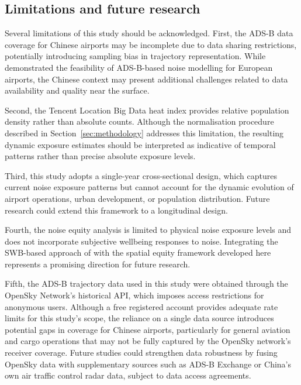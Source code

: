 \documentclass[review,12pt]{elsarticle}
\begin{document}
\subsection{Limitations and future research}

Several limitations of this study should be acknowledged. First, the ADS-B data coverage for Chinese airports may be incomplete due to data sharing restrictions, potentially introducing sampling bias in trajectory representation. While \citet{pretto2024aircraft} demonstrated the feasibility of ADS-B-based noise modelling for European airports, the Chinese context may present additional challenges related to data availability and quality near the surface.

Second, the Tencent Location Big Data heat index provides relative population density rather than absolute counts. Although the normalisation procedure described in Section~\ref{sec:methodology} addresses this limitation, the resulting dynamic exposure estimates should be interpreted as indicative of temporal patterns rather than precise absolute exposure levels.

Third, this study adopts a single-year cross-sectional design, which captures current noise exposure patterns but cannot account for the dynamic evolution of airport operations, urban development, or population distribution. Future research could extend this framework to a longitudinal design.

Fourth, the noise equity analysis is limited to physical noise exposure levels and does not incorporate subjective wellbeing responses to noise. Integrating the SWB-based approach of \citet{fujiwara2017experience} with the spatial equity framework developed here represents a promising direction for future research.

Fifth, the ADS-B trajectory data used in this study were obtained through the OpenSky Network's historical API, which imposes access restrictions for anonymous users. Although a free registered account provides adequate rate limits for this study's scope, the reliance on a single data source introduces potential gaps in coverage for Chinese airports, particularly for general aviation and cargo operations that may not be fully captured by the OpenSky network's receiver coverage. Future studies could strengthen data robustness by fusing OpenSky data with supplementary sources such as ADS-B Exchange or China's own air traffic control radar data, subject to data access agreements.

\end{document}
